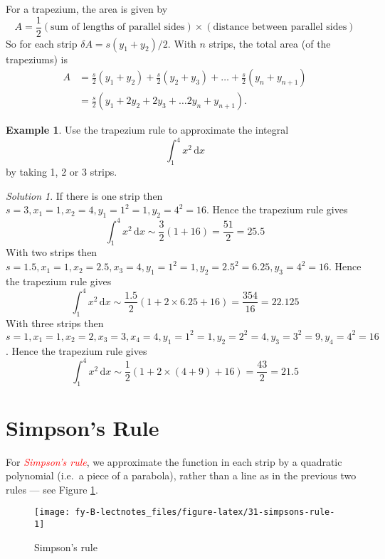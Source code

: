 \documentclass[
  11pt,
  oneside]{book}
\newcommand{\slide}{}
\theoremstyle{definition}
\theoremstyle{definition}
\newtheorem{example}{Example}[chapter]
\theoremstyle{definition}
\theoremstyle{definition}
\theoremstyle{remark}
\newtheorem*{solution}{Solution}
\begin{document}
For a trapezium, the area is given by
\[
A =\frac12(\text{sum of lengths of parallel sides}) \times(\text{distance between parallel sides})
\]
So for each strip \(\delta A =s(y_1+y_2)/2\). With \(n\) strips, the total area (of the trapeziums) is
\begin{align*}
A& = \frac s2(y_1+y_2) + \frac s2(y_2+y_3) + \ldots + \frac s2(y_{n}+y_{n+1})\\
&= \frac s2\left(y_1+2y_2+2y_3+\ldots 2y_{n}+y_{n+1}\right).
\end{align*}

\slide

\begin{example}
Use the trapezium rule to approximate the integral
\[
\int_1^4x^2\,\mathrm{d}x
\]
by taking 1, 2 or 3 strips.
\end{example}

\begin{solution}
If there is one strip then \(s=3, x_1=1, x_2 = 4, y_1=1^2=1, y_2=4^2=16\). Hence the trapezium rule gives
\[
\int_1^4 x^2 \,\mathrm{d}x \sim \frac32\left(1+16\right) = \frac{51}{2} = 25.5
\]
With two strips then \(s=1.5,x_1=1, x_2=2.5, x_3=4, y_1=1^2=1, y_2=2.5^2=6.25, y_3=4^2=16\). Hence the trapezium rule gives
\[
\int_1^4 x^2 \,\mathrm{d}x \sim \frac{1.5}2\left(1+2\times6.25+16\right) = \frac{354}{16} = 22.125
\]
With three strips then \(s=1,x_1=1, x_2=2, x_3 = 3, x_4=4, y_1=1^2=1, y_2=2^2=4, y_3=3^2=9, y_4=4^2=16\). Hence the trapezium rule gives
\[
\int_1^4 x^2 \,\mathrm{d}x \sim \frac{1}2\left(1+2\times(4+9)+16\right) = \frac{43}{2} = 21.5
\]
\end{solution}

\slide

\begin{slidesonly}

\hbox{}
\slide

\end{slidesonly}

\section{Simpson's Rule}\label{simpsons-rule}

For \textcolor{red}{\em Simpson's rule}, we approximate the function in each strip by a quadratic polynomial (i.e.~a piece of a parabola), rather than a line as in the previous two rules --- see Figure \ref{fig:31-simpsons-rule}.

\begin{figure}

{\centering \texttt{[image: fy-B-lectnotes\_files/figure-latex/31-simpsons-rule-1]} 

}

\caption{Simpson's rule}\label{fig:31-simpsons-rule}
\end{figure}
\end{document}
